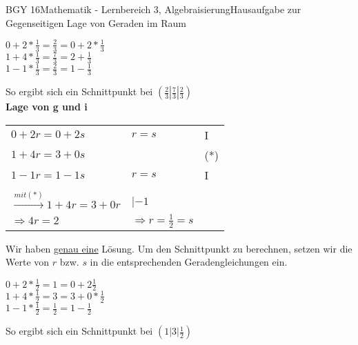\documentclass[oneside,openany,headings=optiontotoc,11pt,numbers=noenddot]{scrreprt}
\begin{document}
\begin{worksheet}{BGY 16}{Mathematik - Lernbereich 3, Algebraisierung}{Hausaufgabe zur Gegenseitigen Lage von Geraden im Raum}
\begin{framed}
\begin{center}
				\(0+2*\frac{1}{3}= \frac{2}{3} = 0 + 2*\frac{1}{3} \)\\
				\(1 + 4*\frac{1}{3} = \frac{7}{3} = 2 + \frac{1}{3}\)\\
				\(1 - 1*\frac{1}{3} = \frac{2}{3} = 1 - \frac{1}{3}\)\\
			\end{center}
			So ergibt sich ein Schnittpunkt bei \((\frac{2}{3}|\frac{7}{3}|\frac{2}{3})\)\\
			\newpage
			\noindent
			\textbf{Lage von g und i}\\
			\par\noindent
			\begin{tabularx}{\textwidth}{lll}
				\(0+2r = 0+2s\) & \(r=s\) & I\\
				\(1+4r = 3+0s\) & & (*)\\
				\(1-1r = 1-1s\) & \(r=s\) & I\\
				\hline\\
				\(\xrightarrow{mit (*)} 1+4r = 3+0r\) & |\(-1\)\\
				\(\Rightarrow 4r = 2\) & \(\Rightarrow r = \frac{1}{2} = s\)\\
			\end{tabularx}
			Wir haben \underline{genau eine} Lösung. Um den Schnittpunkt zu berechnen, setzen wir die Werte von \(r\) bzw. \(s\) in die entsprechenden Geradengleichungen ein.\\
			\begin{center}
				\(0+2*\frac{1}{2}= 1 = 0 + 2\frac{1}{2} \)\\
				\(1 + 4*\frac{1}{2} = 3 = 3 + 0*\frac{1}{2}\)\\
				\(1 - 1*\frac{1}{2} = \frac{1}{2} = 1 - \frac{1}{2}\)\\
			\end{center}
			So ergibt sich ein Schnittpunkt bei \((1|3|\frac{1}{2})\)\\
		\end{framed}
	\end{worksheet}
\end{document}
